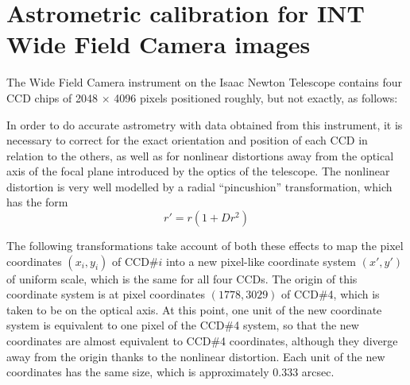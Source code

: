\documentclass[11pt]{article}
\begin{document}
\section{Astrometric calibration for INT Wide Field Camera images}

The Wide Field Camera instrument on the Isaac Newton Telescope 
contains four CCD chips of 2048 $\times$ 4096 pixels 
positioned roughly, but not exactly, as follows:
\begin{quote}
\begin{center}
\end{center}
\end{quote}
In order to do accurate astrometry with data obtained
from this instrument, it is necessary to correct for the 
exact orientation and position of each CCD in relation to
the others, as well as for nonlinear distortions
away from the optical axis of the focal plane introduced by
the optics of the telescope.
The nonlinear distortion is very well modelled by a radial ``pincushion''
transformation, which has the form
\begin{displaymath}
  r' = r ( 1 + D r^2 )
\end{displaymath}

The following transformations take account of both these effects
to map the pixel coordinates $(x_i, y_i)$
of CCD\#$i$ into a new pixel-like coordinate system 
$(x', y')$
of uniform scale, which is the same for all four CCDs.
The origin of this coordinate system is at pixel coordinates
$(1778, 3029)$ of CCD\#4, which is taken to be on the optical axis.
At this point, one unit of the new coordinate system is equivalent
to one pixel of the CCD\#4 system, so that the new coordinates 
are almost equivalent to CCD\#4 coordinates, although they diverge
away from the origin thanks to the nonlinear distortion.
Each unit of the new coordinates has the same size, 
which is approximately 0.333 arcsec.
\end{document}
